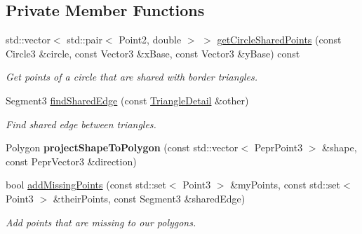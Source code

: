 \subsection*{Private Member Functions}
\begin{DoxyCompactItemize}
\item 
\mbox{\label{classpepr3d_1_1_triangle_detail_ae52e30e876624fe52bdb0724da98bda5}} 
std\+::vector$<$ std\+::pair$<$ Point2, double $>$ $>$ \mbox{\hyperlink{classpepr3d_1_1_triangle_detail_ae52e30e876624fe52bdb0724da98bda5}{get\+Circle\+Shared\+Points}} (const Circle3 \&circle, const Vector3 \&x\+Base, const Vector3 \&y\+Base) const
\begin{DoxyCompactList}\small\item\em Get points of a circle that are shared with border triangles. \end{DoxyCompactList}\item 
\mbox{\label{classpepr3d_1_1_triangle_detail_a4e04c9ef44eb6d48dacce49e547ba190}} 
Segment3 \mbox{\hyperlink{classpepr3d_1_1_triangle_detail_a4e04c9ef44eb6d48dacce49e547ba190}{find\+Shared\+Edge}} (const \mbox{\hyperlink{classpepr3d_1_1_triangle_detail}{Triangle\+Detail}} \&other)
\begin{DoxyCompactList}\small\item\em Find shared edge between triangles. \end{DoxyCompactList}\item 
\mbox{\label{classpepr3d_1_1_triangle_detail_a876f96672cba689d1f74cac6e179192f}} 
Polygon {\bfseries project\+Shape\+To\+Polygon} (const std\+::vector$<$ Pepr\+Point3 $>$ \&shape, const Pepr\+Vector3 \&direction)
\item 
bool \mbox{\hyperlink{classpepr3d_1_1_triangle_detail_a9d193b7c01d33c650b58738aed37e0e6}{add\+Missing\+Points}} (const std\+::set$<$ Point3 $>$ \&my\+Points, const std\+::set$<$ Point3 $>$ \&their\+Points, const Segment3 \&shared\+Edge)
\begin{DoxyCompactList}\small\item\em Add points that are missing to our polygons. \end{DoxyCompactList}\item 
\mbox{\label{classpepr3d_1_1_triangle_detail_aed92acb55850155cbc54142653afbcc4}} 

\end{DoxyCompactItemize}
